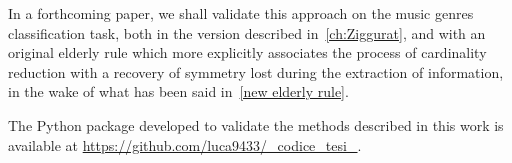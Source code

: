 \documentclass[english, LaM, oneside, noexaminfo]{sapthesis}
\begin{document}
In a forthcoming paper, we shall validate this approach on the music genres classification task, both in the version described in~\cref{ch:Ziggurat}, and with an original elderly rule which more explicitly associates the process of cardinality reduction with a recovery of symmetry lost during the extraction of information, in the wake of what has been said in~\cref{new elderly rule}.

The Python package developed to validate the methods described in this work is available at \href{https://github.com/luca9433/_codice_tesi_}{https://github.com/luca9433/_codice_tesi_}.




\printbibliography
\end{document}
